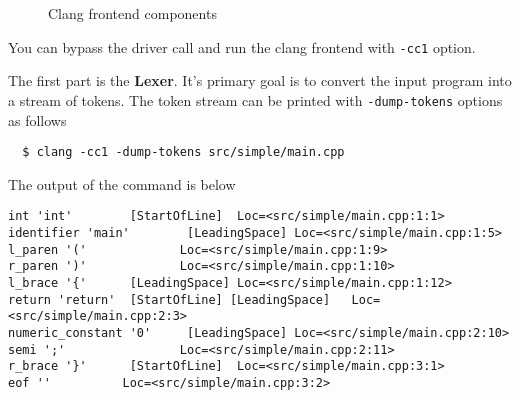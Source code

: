 \begin{figure}
  \begin{center}
  \end{center}
  \caption{{Clang frontend components}}
  \label{fig:clang_frontend}
\end{figure}


You can bypass the driver call and run the clang frontend  with
\texttt{-cc1} option. 

The first part is the \textbf{Lexer}. It's primary goal is to convert the input
program into a stream of tokens. The token stream can be printed with
\texttt{-dump-tokens} options as follows
\begin{verbatim}
  $ clang -cc1 -dump-tokens src/simple/main.cpp
\end{verbatim}
The output of the command is below
\begin{verbatim}
int 'int'        [StartOfLine]  Loc=<src/simple/main.cpp:1:1>
identifier 'main'        [LeadingSpace] Loc=<src/simple/main.cpp:1:5>
l_paren '('             Loc=<src/simple/main.cpp:1:9>
r_paren ')'             Loc=<src/simple/main.cpp:1:10>
l_brace '{'      [LeadingSpace] Loc=<src/simple/main.cpp:1:12>
return 'return'  [StartOfLine] [LeadingSpace]   Loc=<src/simple/main.cpp:2:3>
numeric_constant '0'     [LeadingSpace] Loc=<src/simple/main.cpp:2:10>
semi ';'                Loc=<src/simple/main.cpp:2:11>
r_brace '}'      [StartOfLine]  Loc=<src/simple/main.cpp:3:1>
eof ''          Loc=<src/simple/main.cpp:3:2>
\end{verbatim}

